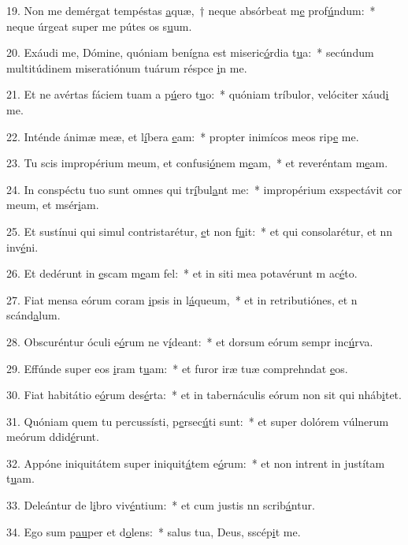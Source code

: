 19. Non me demérgat tempéstas \uline{a}quæ,~† neque absórbeat m\uline{e} prof\uline{ú}ndum:~* neque úrgeat super me pútes os s\uline{u}um.\par 
20. Exáudi me, Dómine, quóniam benígna est miseric\uline{ó}rdia t\uline{u}a:~* secúndum multitúdinem miseratiónum tuárum réspce \uline{i}n me.\par 
21. Et ne avértas fáciem tuam a p\uline{ú}ero t\uline{u}o:~* quóniam tríbulor, velóciter xáud\uline{i} me.\par 
22. Inténde ánimæ meæ, et l\uline{í}bera \uline{e}am:~* propter inimícos meos rip\uline{e} me.\par 
23. Tu scis impropérium meum, et confusi\uline{ó}nem m\uline{e}am,~* et reveréntam m\uline{e}am.\par 
24. In conspéctu tuo sunt omnes qui tr\uline{í}bul\uline{a}nt me:~* impropérium exspectávit cor meum, et msér\uline{i}am.\par 
25. Et sustínui qui simul contristarétur, \uline{e}t non f\uline{u}it:~* et qui consolarétur, et nn inv\uline{é}ni.\par 
26. Et dedérunt in \uline{e}scam m\uline{e}am fel:~* et in siti mea potavérunt m ac\uline{é}to.\par 
27. Fiat mensa eórum coram \uline{i}psis in l\uline{á}queum,~* et in retributiónes, et n scánd\uline{a}lum.\par 
28. Obscuréntur óculi e\uline{ó}rum ne v\uline{í}deant:~* et dorsum eórum sempr inc\uline{ú}rva.\par 
29. Effúnde super eos \uline{i}ram t\uline{u}am:~* et furor iræ tuæ comprehndat \uline{e}os.\par 
30. Fiat habitátio e\uline{ó}rum des\uline{é}rta:~* et in tabernáculis eórum non sit qui nháb\uline{i}tet.\par 
31. Quóniam quem tu percussísti, p\uline{e}rsec\uline{ú}ti sunt:~* et super dolórem vúlnerum meórum ddid\uline{é}runt.\par 
32. Appóne iniquitátem super iniquit\uline{á}tem e\uline{ó}rum:~* et non intrent in justítam t\uline{u}am.\par 
33. Deleántur de l\uline{i}bro viv\uline{é}ntium:~* et cum justis nn scrib\uline{á}ntur.\par 
34. Ego sum p\uline{au}per et d\uline{o}lens:~* salus tua, Deus, sscép\uline{i}t me.\par 
